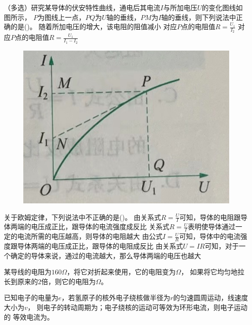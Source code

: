 \documentclass[a4paper,cs4size]{BHCexam}
\begin{document}
\begin{groups}
\begin{questions}[]
        \question[5] （多选）研究某导体的伏安特性曲线，通电后其电流$I$与所加电压$U$的变化图线如图所示，
        $P$为图线上一点，$PQ$为$U$轴的垂线，$PM$为$I$轴的垂线，则下列说法中正确的是(\quad\quad\quad)。
        {随着所加电压的增大，该电阻的阻值减小}
        {对应$P$点的电阻值$R=\frac{U_1}{I_2}$}
        {对应$P$点的电阻值$R=\frac{U_1}{I_1-I_2}$}
        \vspace{-4.5cm}
        \begin{figure}[htb]
            \flushright
            \includegraphics [scale=0.4,trim=0 0 0 0]{./image/physics_circuit1_2.png}
            \label{fig:fig_circuit1_2}
        \end{figure}
        \vspace{2.5cm}

        \question[5] 关于欧姆定律，下列说法中不正确的是(\quad\quad\quad)。
        \fourchoices
        {由关系式$R=\frac{U}{I}$可知，导体的电阻跟导体两端的电压成正比，跟导体的电流强度成反比}
        {关系式$R=\frac{U}{I}$表明使导体通过一定的电流所需的电压越高，则导体的电阻越大}
        {由公式$I=\frac{U}{R}$可知，导体中的电流强度跟导体两端的电压成正比，跟导体的电阻成反比}
        {由关系式$U=IR$可知，对于一个确定的导体来说，通过的电流越大，那么导体两端的电压也越大}
        \vspace{1.5cm}

        \question[5] 某导线的电阻为$160\Omega$，将它对折起来使用，它的电阻变为\underline{\quad\quad\quad\quad}$\Omega$，
        如果将它均匀地拉长到原来的$2$倍，则它的电阻为\underline{\quad\quad\quad\quad}$\Omega$。
        \vspace{1.5cm}

        \question[5] 已知电子的电量为$e$，若氢原子的核外电子绕核做半径为$r$的匀速圆周运动，线速度大小为$v$，
        则电子的转动周期为\underline{\quad\quad\quad\quad}；电子绕核的运动可等效为环形电流，则电子运动的
        等效电流为\underline{\quad\quad\quad\quad}。



    \end{questions}





\end{groups}


\label{lastpage}
\end{document}
